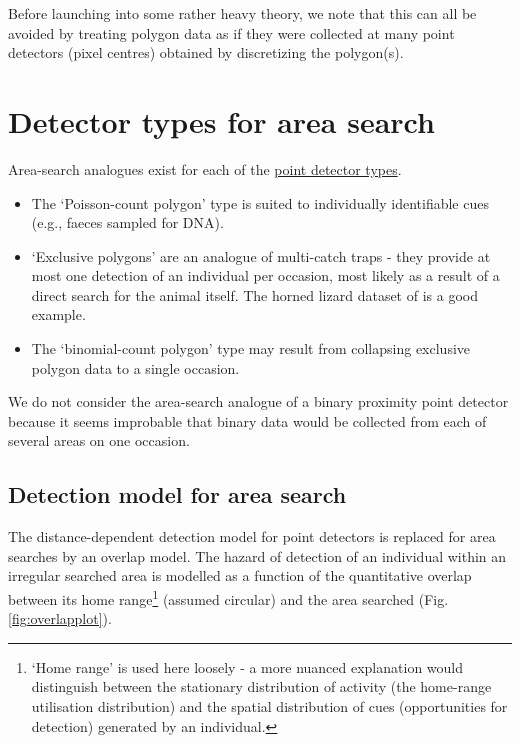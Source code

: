 \documentclass[
]{book}
\providecommand{\tightlist}{%
  \setlength{\itemsep}{0pt}\setlength{\parskip}{0pt}}
\begin{document}
Before launching into some rather heavy theory, we note that this can all be avoided by treating polygon data as if they were collected at many point detectors (pixel centres) obtained by discretizing the polygon(s).

\section{Detector types for area search}\label{detector-types-for-area-search}


Area-search analogues exist for each of the \hyperref[pointdetectors]{point detector types}.

\begin{itemize}
\tightlist
\item
  The `Poisson-count polygon' type is suited to individually identifiable cues (e.g., faeces sampled for DNA).
\item
  `Exclusive polygons' are an analogue of multi-catch traps - they provide at most one detection of an individual per occasion, most likely as a result of a direct search for the animal itself. The horned lizard dataset of \citet{ry08} is a good example.
\item
  The `binomial-count polygon' type may result from collapsing exclusive polygon data to a single occasion.
\end{itemize}

We do not consider the area-search analogue of a binary proximity point detector because it seems improbable that binary data would be collected from each of several areas on one occasion.

\subsection{Detection model for area search}\label{detection-model-for-area-search}

The distance-dependent detection model for point detectors is replaced for area searches by an overlap model. The hazard of detection of an individual within an irregular searched area is modelled as a function of the quantitative overlap between its home range\footnote{`Home range' is used here loosely - a more nuanced explanation would distinguish between the stationary distribution of activity (the home-range utilisation distribution) and the spatial distribution of cues (opportunities for detection) generated by an individual.} (assumed circular) and the area searched (Fig. \ref{fig:overlapplot}).
\end{document}
